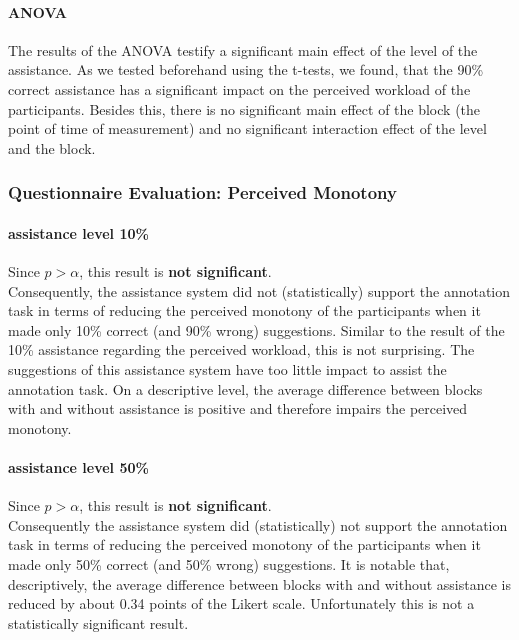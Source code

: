 		\paragraph{\ac{ANOVA}}
		The results of the \ac{ANOVA} testify a significant main effect of the level of the assistance. As we tested beforehand using the t-tests, we found, that the 90\% correct assistance has a significant impact on the perceived workload of the participants. Besides this, there is no significant main effect of the block (the point of time of measurement) and no significant interaction effect of the level and the block.



	\subsubsection{Questionnaire Evaluation: Perceived Monotony}
		\paragraph{assistance level 10\%}
		Since \(p > \alpha\), this result is \textbf{not significant}.\\
		Consequently, the assistance system did not (statistically) support the annotation task in terms of reducing the perceived monotony of the participants when it made only 10\% correct (and 90\% wrong) suggestions. Similar to the result of the 10\% assistance regarding the perceived workload, this is not surprising. The suggestions of this assistance system have too little impact to assist the annotation task. On a descriptive level, the average difference between blocks with and without assistance is positive and therefore impairs the perceived monotony.

		\paragraph{assistance level 50\%}
		Since \(p > \alpha\), this result is \textbf{not significant}.\\
		Consequently the assistance system did (statistically) not support the annotation task in terms of reducing the perceived monotony of the participants when it made only 50\% correct (and 50\% wrong) suggestions. It is notable that, descriptively, the average difference between blocks with and without assistance is reduced by about 0.34 points of the Likert scale. Unfortunately this is not a statistically significant result.

